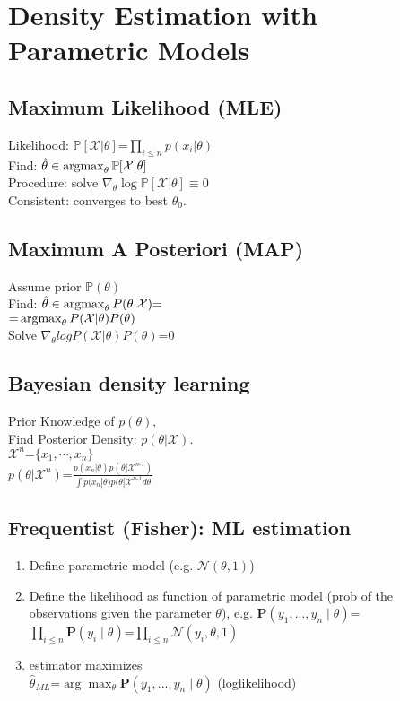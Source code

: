 \section{Density Estimation with Parametric Models}
\subsection{Maximum Likelihood (MLE)}
Likelihood: $\mathbb{P}[\mathcal{X}|\theta]\text{=}\prod_{i\leq n}p(x_i|\theta)$\\
Find: $\hat{\theta}\in \mathop{\mathrm{argmax}}_\theta \mathbb{P}[\mathcal{X}|\theta]$\\
Procedure: solve $\nabla_\theta \log \mathbb{P}[\mathcal{X}|\theta]\equiv 0$\\
Consistent: converges to best $\theta_0$.

\subsection{Maximum A Posteriori (MAP)}
Assume prior $\mathbb{P}(\theta)$\\
Find: $\hat{\theta}\in \mathop{\mathrm{argmax}}_\theta P(\theta|\mathcal{X}) \text{=}$\\
$\text{=}\mathop{\mathrm{argmax}}_\theta P(\mathcal{X}|\theta)P(\theta)$\\
Solve $\nabla_\theta log P(\mathcal{X}|\theta)P(\theta)\text{=}0$

\subsection{Bayesian density learning}
Prior Knowledge of $p(\theta)$,\\
Find Posterior Density: $p(\theta|\mathcal{X})$.\\
$\mathcal{X}^n\text{=}\{x_1, \cdots, x_n\}$\\
$p(\theta|\mathcal{X}^n)\text{=}\frac{p(x_n|\theta)p(\theta|\mathcal{X}^{n\text{-}1})}{\int p(x_n|\theta)p(\theta|\mathcal{X}^{n\text{-}1} d\theta}$


\subsection{Frequentist (Fisher): ML estimation}
\begin{enumerate}
	\item Define parametric model (e.g. $\mathcal N(\theta, 1)$)
	\item Define the likelihood as function of parametric model (prob of the observations given the parameter $\theta$), e.g.
	$\mathbf P(y_1, ..., y_n \mid \theta) \text{=}$ \\$\prod_{i\leq n}\mathbf P(y_i\mid \theta) \text{=} \prod_{i\leq n}\mathcal N(y_i, \theta, 1)
	$
	\item estimator maximizes \\$\hat\theta_{ML} \text{=} \arg\max_\theta \mathbf P(y_1, ..., y_n \mid \theta)$ (log\text{-}likelihood)
\end{enumerate}


